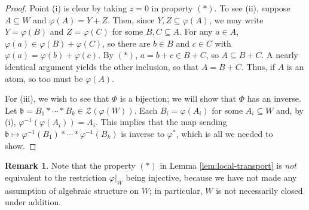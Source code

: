 \documentclass{report}
\newcommand{\bb}{\mathfrak{b}}
\newcommand{\Z}{\mathcal{Z}}
\renewcommand{\:}{\text{:}}
\theoremstyle{definition}
\newtheorem{rk}[defn]{Remark}
\begin{document}
\begin{proof}
Point (i) is clear by taking $z = 0$ in property $(*)$.
To see (ii), suppose $A\subseteq W$ and $\varphi(A) = Y+Z$.
Then, since $Y,Z\subseteq \varphi(A)$, we may write $Y = \varphi(B)$ and $Z = \varphi(C)$ for some $B,C\subseteq A$.
For any $a\in A$, $\varphi(a) \in \varphi(B) + \varphi(C)$, so there are $b\in B$ and $c\in C$ with $\varphi(a) = \varphi(b) + \varphi(c)$.
By $(*)$, $a = b + c \in B+C$, so $A \subseteq B + C$.
A nearly identical argument yields the other inclusion, so that $A = B+C$.
Thus, if $A$ is an atom, so too must be $\varphi(A)$. 

For (iii), we wish to see that $\Phi$ is a bijection; we will show that $\Phi$ has an inverse.
Let $\bb = B_1 * \cdots * B_k\in \Z(\varphi(W))$.
Each $B_i = \varphi(A_i)$ for some $A_i\subseteq W$ and, by (i), $\varphi^{-1}(\varphi(A_i)) = A_i$.
This implies that the map sending $\bb \mapsto \varphi^{-1}(B_1) * \cdots * \varphi^{-1}(B_k)$ is inverse to $\varphi^*$, which is all we needed to show.
\end{proof}

\begin{rk}
Note that the property $(*)$ in Lemma \ref{lem:local-transport} is \textit{not} equivalent to the restriction $\varphi|_W$ being injective, because we have not made any assumption of algebraic structure on $W$; in particular, $W$ is not necessarily closed under addition. 
\end{rk}
\end{document}
